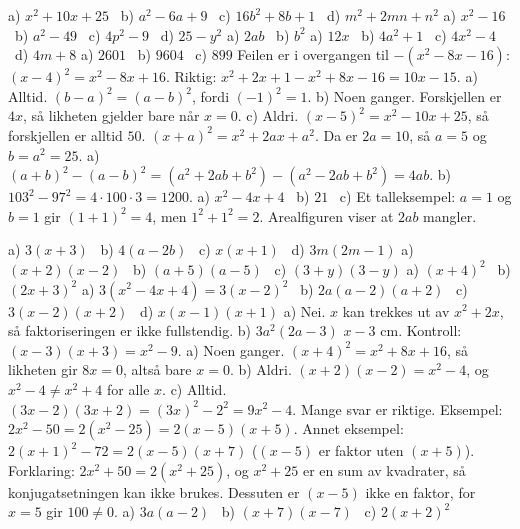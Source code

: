 
 a) $x^2 + 10x + 25$ \ b) $a^2 - 6a + 9$ \ c) $16b^2 + 8b + 1$ \ d) $m^2 + 2mn + n^2$
 a) $x^2 - 16$ \ b) $a^2 - 49$ \ c) $4p^2 - 9$ \ d) $25 - y^2$
 a) $2ab$ \ b) $b^2$
 a) $12x$ \ b) $4a^2 + 1$ \ c) $4x^2 - 4$ \ d) $4m + 8$
 a) $2601$ \ b) $9604$ \ c) $899$
 Feilen er i overgangen til $-(x^2 - 8x - 16)$: $(x-4)^2 = x^2 - 8x + 16$. Riktig: $x^2 + 2x + 1 - x^2 + 8x - 16 = 10x - 15$.
 a) Alltid. $(b-a)^2 = (a-b)^2$, fordi $(-1)^2 = 1$.
b) Noen ganger. Forskjellen er $4x$, så likheten gjelder bare når $x = 0$.
c) Aldri. $(x-5)^2 = x^2 - 10x + 25$, så forskjellen er alltid $50$.
 $(x+a)^2 = x^2 + 2ax + a^2$. Da er $2a = 10$, så $a = 5$ og $b = a^2 = 25$.
 a) $(a+b)^2 - (a-b)^2 = (a^2 + 2ab + b^2) - (a^2 - 2ab + b^2) = 4ab$.
b) $103^2 - 97^2 = 4 \cdot 100 \cdot 3 = 1200$.
 a) $x^2 - 4x + 4$ \ b) $21$ \ c) Et talleksempel: $a = 1$ og $b = 1$ gir $(1+1)^2 = 4$, men $1^2 + 1^2 = 2$. Arealfiguren viser at $2ab$ mangler.

 a) $3(x+3)$ \ b) $4(a-2b)$ \ c) $x(x+1)$ \ d) $3m(2m-1)$
 a) $(x+2)(x-2)$ \ b) $(a+5)(a-5)$ \ c) $(3+y)(3-y)$
 a) $(x+4)^2$ \ b) $(2x+3)^2$
 a) $3(x^2 - 4x + 4) = 3(x-2)^2$ \ b) $2a(a-2)(a+2)$ \ c) $3(x-2)(x+2)$ \ d) $x(x-1)(x+1)$
 a) Nei. $x$ kan trekkes ut av $x^2 + 2x$, så faktoriseringen er ikke fullstendig.
b) $3a^2(2a-3)$
 $x - 3$ cm. Kontroll: $(x-3)(x+3) = x^2 - 9$.
 a) Noen ganger. $(x+4)^2 = x^2 + 8x + 16$, så likheten gir $8x = 0$, altså bare $x = 0$.
b) Aldri. $(x+2)(x-2) = x^2 - 4$, og $x^2 - 4 \neq x^2 + 4$ for alle $x$.
c) Alltid. $(3x-2)(3x+2) = (3x)^2 - 2^2 = 9x^2 - 4$.
 Mange svar er riktige. Eksempel: $2x^2 - 50 = 2(x^2 - 25) = 2(x-5)(x+5)$. Annet eksempel: $2(x+1)^2 - 72 = 2(x-5)(x+7)$ ($(x-5)$ er faktor uten $(x+5)$). Forklaring: $2x^2 + 50 = 2(x^2 + 25)$, og $x^2 + 25$ er en sum av kvadrater, så konjugatsetningen kan ikke brukes. Dessuten er $(x-5)$ ikke en faktor, for $x = 5$ gir $100 \neq 0$.
 a) $3a(a-2)$ \ b) $(x+7)(x-7)$ \ c) $2(x+2)^2$


